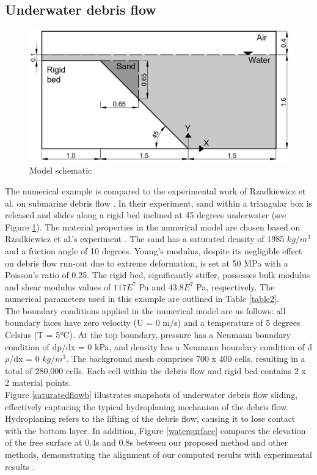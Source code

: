 \documentclass[preprint,12pt]{elsarticle}
\begin{document}
\subsection{\textsf{Underwater debris flow}}
%
%
\begin{figure}[h]
\center
\includegraphics[scale=.3]{SandBoxscheme.jpg}
\caption{Model schematic}
\label{fig:SandBoxModel}
\end {figure}
%
%
The numerical example is compared to the experimental work of Rzadkiewicz et al. on submarine debris flow \cite{Rzadkiewicz}. In their experiment, sand within a triangular box is released and slides along a rigid bed inclined at 45 degrees underwater (see Figure \ref{fig:SandBoxModel}). The material properties in the numerical model are chosen based on Rzadkiewicz et al.'s experiment \cite{Rzadkiewicz}. The sand has a saturated density of 1985 $kg/m^3$ and a friction angle of 10 degrees. Young's modulus, despite its negligible effect on debris flow run-out due to extreme deformation, is set at 50 MPa with a Poisson's ratio of 0.25. The rigid bed, significantly stiffer, possesses bulk modulus and shear modulus values of $117E^7$ Pa and $43.8E^7$ Pa, respectively. The numerical parameters used in this example are outlined in Table \ref{table2}.\\
The boundary conditions applied in the numerical model are as follows: all boundary faces have zero velocity (U = 0 m/s) and a temperature of 5 degrees Celsius (T = 5°C). At the top boundary, pressure has a Neumann boundary condition of dp/dx = 0 kPa, and density has a Neumann boundary condition of d$\rho$/dx = 0 $kg/m^3$. The background mesh comprises 700 x 400 cells, resulting in a total of 280,000 cells. Each cell within the debris flow and rigid bed contains 2 x 2 material points.\\
Figure \ref{saturatedflowb} illustrates snapshots of underwater debris flow sliding, effectively capturing the typical hydroplaning mechanism of the debris flow. Hydroplaning refers to the lifting of the debris flow, causing it to lose contact with the bottom layer. In addition, Figure \ref{watersurface} compares the elevation of the free surface at 0.4s and 0.8s between our proposed method and other methods, demonstrating the alignment of our computed results with experimental results \cite{Zhang2019}.\\
\end{document}
